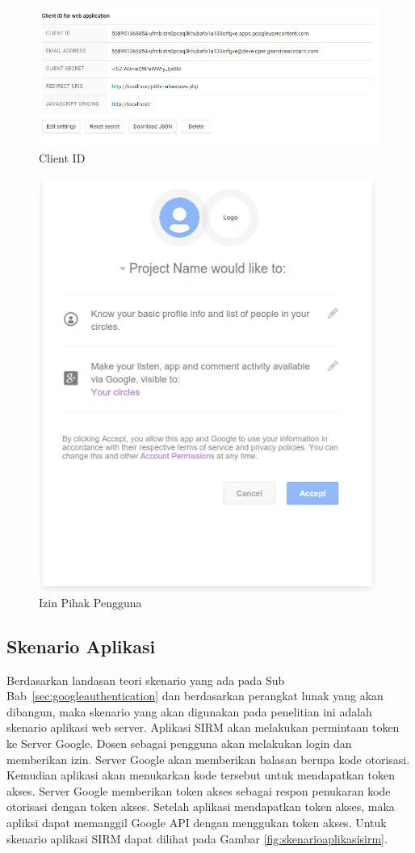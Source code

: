\begin{figure}[ht]
\centering
\includegraphics[scale=0.5]{Gambar/clientid.png}
\caption[Client ID]{Client ID} 
\label{fig:clientid}
\end{figure}

\begin{figure}[ht]
\centering
\includegraphics[scale=0.5]{Gambar/izinpengguna.png}
\caption[Izin Pihak Pengguna]{Izin Pihak Pengguna} 
\label{fig:izinpengguna}
\end{figure}

\subsection{Skenario Aplikasi}
Berdasarkan landasan teori skenario yang ada pada Sub
Bab~\ref{sec:googleauthentication} dan berdasarkan perangkat lunak yang akan
dibangun, maka skenario yang akan digunakan pada penelitian ini adalah skenario
aplikasi web server. Aplikasi SIRM akan melakukan permintaan token ke Server
Google. Dosen sebagai pengguna akan melakukan login dan memberikan izin. Server
Google akan memberikan balasan berupa kode otorisasi. Kemudian aplikasi akan
menukarkan kode tersebut untuk mendapatkan token akses. Server Google memberikan
token akses sebagai respon penukaran kode otorisasi dengan token akses. Setelah
aplikasi mendapatkan token akses, maka apliksi dapat memanggil Google API dengan
menggukan token akses. Untuk skenario aplikasi SIRM dapat dilihat pada Gambar
\ref{fig:skenarioaplikasisirm}.

